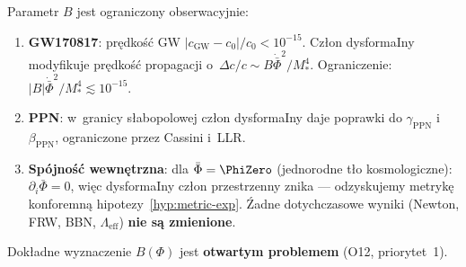 \begin{remark}\label{rem:B-constraints}
Parametr $B$ jest ograniczony obserwacyjnie:
\begin{enumerate}[nosep]
  \item \textbf{GW170817}: pr\k{e}dko\'s\'c GW
    $|c_{\mathrm{GW}} - c_0|/c_0 < 10^{-15}$.
    Cz\l{}on dysformaIny modyfikuje pr\k{e}dko\'s\'c
    propagacji o~$\Delta c/c \sim B\dot{\bar\Phi}^2/M_*^4$.
    Ograniczenie: $|B|\dot{\bar\Phi}^2/M_*^4 \lesssim 10^{-15}$.
  \item \textbf{PPN}: w~granicy s\l{}abopolowej cz\l{}on
    dysformaIny daje poprawki do $\gamma_{\mathrm{PPN}}$
    i~$\beta_{\mathrm{PPN}}$, ograniczone przez
    Cassini i~LLR.
  \item \textbf{Sp\'ojno\'s\'c wewn\k{e}trzna}: dla
    $\bar\Phi = \PhiZero$ (jednorodne t\l{}o kosmologiczne):
    $\partial_i\bar\Phi = 0$, wi\k{e}c dysformaIny cz\l{}on
    przestrzenny znika ---
    odzyskujemy metryk\k{e} konforemn\k{a}
    hipotezy~\ref{hyp:metric-exp}. \'Zadne dotychczasowe
    wyniki (Newton, FRW, BBN, $\Lambda_{\mathrm{eff}}$)
    \textbf{nie s\k{a} zmienione}.
\end{enumerate}
Dok\l{}adne wyznaczenie $B(\Phi)$ jest \textbf{otwartym
problemem} (O12, priorytet~1).
\end{remark}


